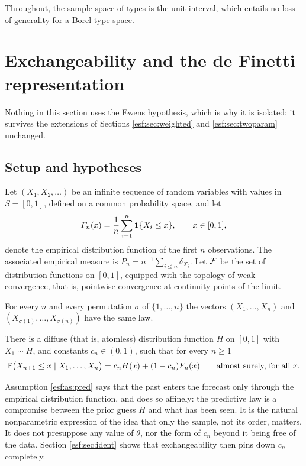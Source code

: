 Throughout, the sample space of types is the unit interval, which entails no loss of
generality for a Borel type space.

\section{Exchangeability and the de Finetti representation}
\label{esf:sec:definetti}

Nothing in this section uses the Ewens hypothesis, which is why it is isolated: it
survives the extensions of Sections \ref{esf:sec:weighted} and \ref{esf:sec:twoparam}
unchanged.

\subsection{Setup and hypotheses}

Let $(X_1, X_2, \dots)$ be an infinite sequence of random variables with values in
$S = [0,1]$, defined on a common probability space, and let
\[
F_n(x) = \frac{1}{n} \sum_{i=1}^{n} \mathbf{1}\{X_i \le x\}, \qquad x \in [0,1],
\]
denote the empirical distribution function of the first $n$ observations. The
associated empirical measure is $P_n = n^{-1} \sum_{i \le n} \delta_{X_i}$. Let
$\mathcal{F}$ be the set of distribution functions on $[0,1]$, equipped with the topology of
weak convergence, that is, pointwise convergence at continuity points of the limit.

\begin{assumption}[Exchangeability]
\label{esf:as:exch}
For every $n$ and every permutation $\sigma$ of $\{1,\dots,n\}$ the vectors
$(X_1,\dots,X_n)$ and $(X_{\sigma(1)},\dots,X_{\sigma(n)})$ have the same law.
\end{assumption}

\begin{assumption}
\label{esf:as:pred}
There is a diffuse (that is, atomless) distribution function $H$ on $[0,1]$ with
$X_1 \sim H$, and constants $c_n \in (0,1)$, such that for every $n \ge 1$
\begin{equation}
\mathbb{P}\bigl(X_{n+1} \le x \mid X_1, \dots, X_n\bigr)
= c_n H(x) + (1 - c_n) F_n(x)
\qquad \text{almost surely, for all } x.
\label{esf:eq:pred}
\end{equation}
\end{assumption}

Assumption \ref{esf:as:pred} says that the past enters the forecast only through the
empirical distribution function, and does so affinely: the predictive law is a
compromise between the prior guess $H$ and what has been seen. It is the natural
nonparametric expression of the idea that only the sample, not its order, matters. It
does not presuppose any value of $\theta$, nor the form of $c_n$ beyond it being free
of the data. Section \ref{esf:sec:ident} shows that exchangeability then pins down $c_n$
completely.

